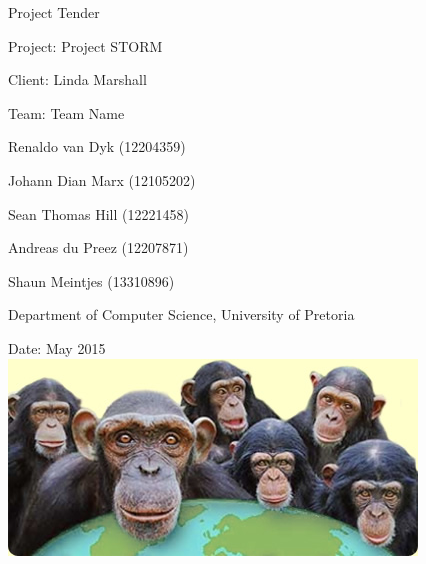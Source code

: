 \documentclass[12pt, oneside]{article}
\begin{document}
\thispagestyle{empty}
\begin{center}
\begin{minipage}{0.9\linewidth}
    \centering


    {\normalsize Project Tender\par}
    \vspace{1cm}
    {\Large Project: Project STORM\par}
{\normalsize Client: Linda Marshall\par}
    \vspace{1cm}
   {\Large Team: Team Name\par}
    {\normalsize Renaldo van Dyk (12204359)\par}
    {\normalsize Johann Dian Marx (12105202)\par}
    {\normalsize Sean Thomas Hill (12221458)\par}
    {\normalsize Andreas du Preez (12207871)\par}
    {\normalsize Shaun Meintjes (13310896)\par}
{\normalsize Department of Computer Science, University of Pretoria\par}
    \vspace{1cm}

 {\normalsize Date: May 2015}
\vspace{1cm}
    \includegraphics[scale=0.07]{example1} %

    \vspace{1cm}
    
\end{minipage}
\end{center}
\clearpage

\newpage
\end{document}
